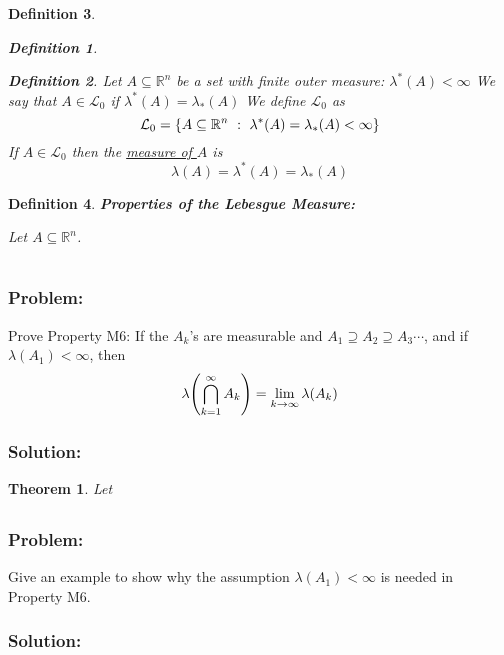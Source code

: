 \documentclass[]{article}
\newcommand{\R}{\mathbb{R}}
\newcommand{\st}{\ : \ }
\newtheorem{definition}{Definition}
\newtheorem{theorem}{Theorem}
\begin{document}
\begin{definition}
\begin{enumerate}
\begin{definition}
            \end{definition}
            \begin{definition}
                Let $A\subseteq \R^n$ be a set with finite outer measure: 
                    $\lambda^*(A) < \infty$
                We say that $A \in \mathcal{L}_0$ if $\lambda^*(A) = \lambda_*(A)$
                We define $\mathcal{L}_0$ as \[
                    \mathcal{L}_0 = \qty{
                        A \subseteq \R^n \st \lambda^*(A) = \lambda_*(A) < \infty
                    }
                \] If $A \in \mathcal{L}_0$ then the \emph{\underline{measure of $A$}} is \[
                    \lambda(A) = \lambda^*(A) = \lambda_*(A)
                \]
            \end{definition}
    \end{enumerate}
\end{definition}

\begin{definition}
    \emph{\textbf{Properties of the Lebesgue Measure:}}

    Let $A \subseteq \R^n$.

\end{definition}







\newpage
\section{}
\subsection{}
\subsubsection*{Problem:}
Prove Property M6: 
If the $A_k$'s are measurable and $A_1 \supseteq A_2 \supseteq A_3 \cdots$, 
and if $\lambda(A_1) < \infty$, 
then \[
    \lambda \qty(
        \bigcap_{k=1}^{\infty} A_k
    ) = \lim_{k \to \infty} \lambda(A_k)
\]
\subsubsection*{Solution:}

\begin{theorem}
    Let 
\end{theorem}


\subsection{}
\subsubsection*{Problem:}
Give an example to show why the assumption $\lambda(A_1) < \infty$ is needed in Property M6.
\subsubsection*{Solution:}
\end{document}
